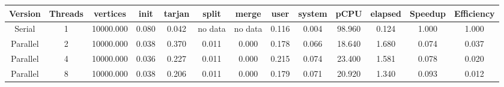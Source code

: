 \begin{tabular}{|c|c|c|c|c|c|c|c|c|c|c|c|c|}
\toprule
 Version &  Threads &  vertices &  init &  tarjan &   split &   merge &  user &  system &   pCPU &  elapsed &  Speedup &  Efficiency \\
\midrule
  Serial &        1 & 10000.000 & 0.080 &   0.042 & no data & no data & 0.116 &   0.004 & 98.960 &    0.124 &    1.000 &       1.000 \\
Parallel &        2 & 10000.000 & 0.038 &   0.370 &   0.011 &   0.000 & 0.178 &   0.066 & 18.640 &    1.680 &    0.074 &       0.037 \\
Parallel &        4 & 10000.000 & 0.036 &   0.227 &   0.011 &   0.000 & 0.215 &   0.074 & 23.400 &    1.581 &    0.078 &       0.020 \\
Parallel &        8 & 10000.000 & 0.038 &   0.206 &   0.011 &   0.000 & 0.179 &   0.071 & 20.920 &    1.340 &    0.093 &       0.012 \\
\bottomrule
\end{tabular}
